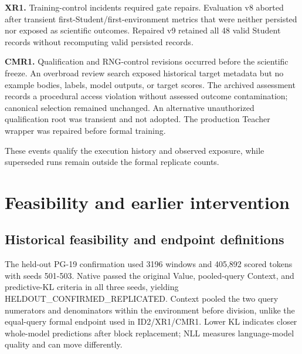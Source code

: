 \textbf{XR1.} Training-control incidents required gate repairs. Evaluation v8 aborted after transient first-Student/first-environment metrics that were neither persisted nor exposed as scientific outcomes. Repaired v9 retained all 48 valid Student records without recomputing valid persisted records.

\textbf{CMR1.} Qualification and RNG-control revisions occurred before the scientific freeze. An overbroad review search exposed historical target metadata but no example bodies, labels, model outputs, or target scores. The archived assessment records a procedural access violation without assessed outcome contamination; canonical selection remained unchanged. An alternative unauthorized qualification root was transient and not adopted. The production Teacher wrapper was repaired before formal training.

These events qualify the execution history and observed exposure, while superseded runs remain outside the formal replicate counts.

\section{Feasibility and earlier intervention}\label{feasibility-and-earlier-intervention}

\subsection{Historical feasibility and endpoint definitions}\label{historical-feasibility-and-endpoint-definitions}

The held-out PG-19 confirmation used 3196 windows and 405,892 scored tokens with seeds 501-503. Native passed the original Value, pooled-query Context, and predictive-KL criteria in all three seeds, yielding HELDOUT\_CONFIRMED\_REPLICATED. Context pooled the two query numerators and denominators within the environment before division, unlike the equal-query formal endpoint used in ID2/XR1/CMR1. Lower KL indicates closer whole-model predictions after block replacement; NLL measures language-model quality and can move differently.

